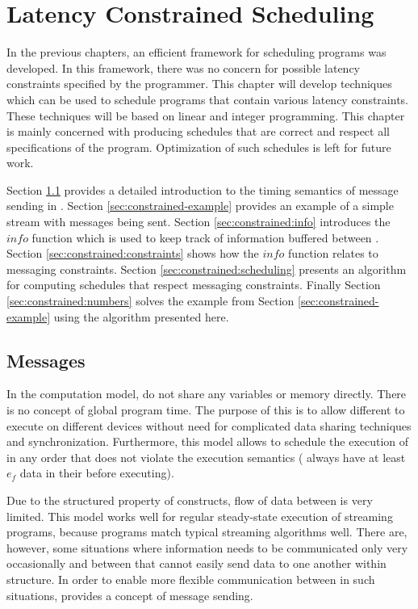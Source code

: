 \section{Latency Constrained Scheduling}
\label{chpt:constrained}

In the previous chapters, an efficient framework for scheduling
{\StreamIt} programs was developed.  In this framework, there was no
concern for possible latency constraints specified by the
programmer. This chapter will develop techniques which can be used
to schedule {\StreamIt} programs that contain various latency
constraints. These techniques will be based on linear and integer
programming. This chapter is mainly concerned with producing
schedules that are correct and respect all specifications of the
program. Optimization of such schedules is left for future work.

Section \ref{sec:constrained:intro} provides a detailed
introduction to the timing semantics of message sending in
{\StreamIt}. Section \ref{sec:constrained-example} provides an
example of a simple stream with messages being sent. Section
\ref{sec:constrained:info} introduces the $info$ function which is
used to keep track of information buffered between {\filters}.
Section \ref{sec:constrained:constraints} shows how the $info$
function relates to messaging constraints. Section
\ref{sec:constrained:scheduling} presents an algorithm for
computing schedules that respect messaging constraints. Finally
Section \ref{sec:constrained:numbers} solves the example from
Section \ref{sec:constrained-example} using the algorithm
presented here.

\subsection{Messages}
\label{sec:constrained:intro}

In the {\StreamIt} computation model, {\filters} do not share any
variables or memory directly.  There is no concept of global
program time.  The purpose of this is to allow different {\filters}
to execute on different devices without need for complicated data
sharing techniques and synchronization. Furthermore, this model
allows to schedule the execution of {\filters} in any order that
does not violate the execution semantics ({\filters} always have at
least $e_f$ data in their {\Input} {\Channel} before executing).

Due to the structured property of {\StreamIt} constructs, flow of
data between {\filters} is very limited. This model works well for
regular steady-state execution of streaming programs, because
{\StreamIt} programs match typical streaming algorithms well.  There
are, however, some situations where information needs to be
communicated only very occasionally and between {\filters} that
cannot easily send data to one another within {\StreamIt} structure.
In order to enable more flexible communication between {\filters} in
such situations, {\StreamIt} provides a concept of message sending.

